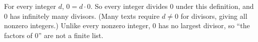 For every integer $d$, $0=d\cdot0$. So every integer divides $0$ under this definition, and $0$ has infinitely many divisors. (Many texts require $d\ne0$ for divisors, giving all nonzero integers.) Unlike every nonzero integer, $0$ has no largest divisor, so ``the factors of $0$'' are not a finite list.
